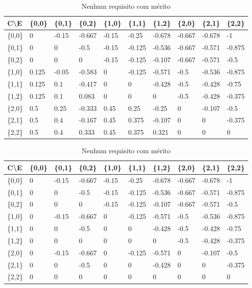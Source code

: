 \documentclass[preprint,12pt]{elsarticle}
\begin{document}
\begin{table}[h]
\caption{ Somente o primeiro requisito com mérito}
\label{table:merit-0-and-1}
\begin{tabular}{@{}llllllllll@{}}
\toprule
C\textbackslash E & \{0,0\} & \{0,1\} & \{0,2\} & \{1,0\} & \{1,1\} & \{1,2\} & \{2,0\} & \{2,1\} & \{2,2\} \\ \midrule
\{0,0\} & 0 & -0.15 & -0.667 & -0.15 & -0.25 & -0.678 & -0.667 & -0.678 & -1 \\
\{0,1\} & 0 & 0 & -0.5 & -0.15 & -0.125 & -0.536 & -0.667 & -0.571 & -0.875 \\
\{0,2\} & 0 & 0 & 0 & -0.15 & -0.125 & -0.107 & -0.667 & -0.571 & -0.5 \\
\{1,0\} & 0.125 & -0.05 & -0.583 & 0 & -0.125 & -0.571 & -0.5 & -0.536 & -0.875 \\
\{1,1\} & 0.125 & 0.1 & -0.417 & 0 & 0 & -0.428 & -0.5 & -0.428 & -0.75 \\
\{1,2\} & 0.125 & 0.1 & 0.083 & 0 & 0 & 0 & -0.5 & -0.428 & -0.375 \\
\{2,0\} & 0.5 & 0.25 & -0.333 & 0.45 & 0.25 & -0.25 & 0 & -0.107 & -0.5 \\
\{2,1\} & 0.5 & 0.4 & -0.167 & 0.45 & 0.375 & -0.107 & 0 & 0 & -0.375 \\
\{2,2\} & 0.5 & 0.4 & 0.333 & 0.45 & 0.375 & 0.321 & 0 & 0 & 0 \\ \bottomrule
\end{tabular}

\caption{Nenhum requisito com mérito}
\label{table:merit-0-all}
\begin{tabular}{@{}llllllllll@{}}
\toprule
C\textbackslash E & \{0,0\} & \{0,1\} & \{0,2\} & \{1,0\} & \{1,1\} & \{1,2\} & \{2,0\} & \{2,1\} & \{2,2\} \\ \midrule
\{0,0\} & 0 & -0.15 & -0.667 & -0.15 & -0.25 & -0.678 & -0.667 & -0.678 & -1 \\
\{0,1\} & 0 & 0 & -0.5 & -0.15 & -0.125 & -0.536 & -0.667 & -0.571 & -0.875 \\
\{0,2\} & 0 & 0 & 0 & -0.15 & -0.125 & -0.107 & -0.667 & -0.571 & -0.5 \\
\{1,0\} & 0 & -0.15 & -0.667 & 0 & -0.125 & -0.571 & -0.5 & -0.536 & -0.875 \\
\{1,1\} & 0 & 0 & -0.5 & 0 & 0 & -0.428 & -0.5 & -0.428 & -0.75 \\
\{1,2\} & 0 & 0 & 0 & 0 & 0 & 0 & -0.5 & -0.428 & -0.375 \\
\{2,0\} & 0 & -0.15 & -0.667 & 0 & -0.125 & -0.571 & 0 & -0.107 & -0.5 \\
\{2,1\} & 0 & 0 & -0.5 & 0 & 0 & -0.428 & 0 & 0 & -0.375 \\
\{2,2\} & 0 & 0 & 0 & 0 & 0 & 0 & 0 & 0 & 0 \\ 
\bottomrule
\end{tabular}
\end{table}
\end{document}
